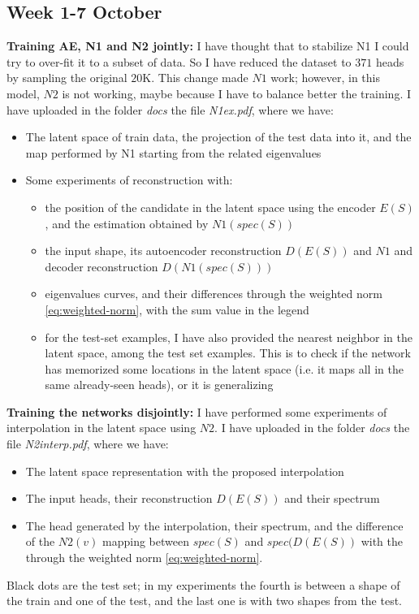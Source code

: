 \subsection{Week 1-7 October}

\textbf{Training AE, N1 and N2 jointly:} I have thought that to stabilize N1 I could try to over-fit it to a subset of data. So I have reduced the dataset to $371$ heads by sampling the original $20$K. This change made $N1$ work; however, in this model, $N2$ is not working, maybe because I have to balance better the training. I have uploaded in the folder \emph{docs} the file \emph{N1ex.pdf}, where we have:
\begin{itemize}
    \item The latent space of train data, the projection of the test data into it, and the map performed by N1 starting from the related eigenvalues
    \item Some experiments of reconstruction with:
    \begin{itemize}
        \item the position of the candidate in the latent space using the encoder $E(S)$ , and the estimation obtained by $N1(spec(S))$ 
        \item the input shape, its autoencoder reconstruction $D(E(S))$ and $N1$ and decoder reconstruction $D(N1(spec(S)))$
        \item eigenvalues curves, and their differences through the weighted norm \ref{eq:weighted-norm}, with the sum value in the legend
        \item for the test-set examples, I have also provided the nearest neighbor in the latent space, among the test set examples. This is to check if the network has memorized some locations in the latent space (i.e. it maps all in the same already-seen heads), or it is generalizing
    \end{itemize}
\end{itemize}

\textbf{Training the networks disjointly:} I have performed some experiments of interpolation in the latent space using $N2$. I have uploaded in the folder \emph{docs} the file \emph{N2interp.pdf}, where we have:
\begin{itemize}
\item The latent space representation with the proposed interpolation
\item The input heads, their reconstruction $D(E(S))$ and their spectrum
\item The head generated by the interpolation, their spectrum, and the difference of the $N2(v)$ mapping between $spec(S)$ and $spec(D(E(S))$ with the through the weighted norm \ref{eq:weighted-norm}.
\end{itemize}
Black dots are the test set; in my experiments the fourth is between a shape of the train and one of the test, and the last one is with two shapes from the test.


